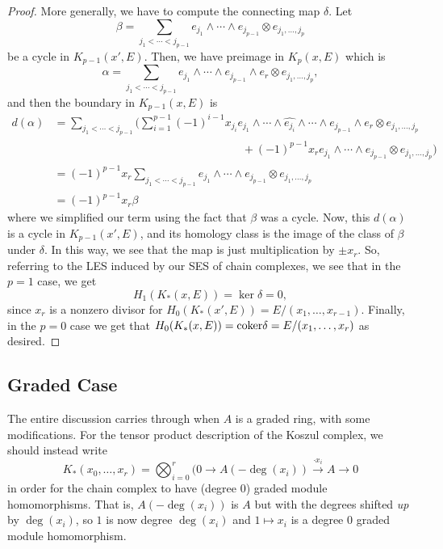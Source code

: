 \documentclass[12pt]{article}
\begin{document}
\begin{proof}
    More generally, we have to compute the connecting map $\delta$. Let
    \[\beta = \sum_{j_1<\cdots<j_{p-1}} e_{j_1}\wedge \cdots \wedge e_{j_{p-1}} \otimes e_{j_1,\dots,j_p}\]
    be a cycle in $K_{p-1}(x',E)$. Then, we have preimage in $K_p(x,E)$ which is
    \[\alpha = \sum_{j_1<\cdots<j_{p-1}} e_{j_1}\wedge \cdots \wedge e_{j_{p-1}} \wedge e_r \otimes e_{j_1,\dots,j_p},\]
    and then the boundary in $K_{p-1}(x,E)$ is
    \begin{align*}
        d(\alpha) &= \sum_{j_1<\cdots<j_{p-1}} \Big( \sum_{i=1}^{p-1} (-1)^{i-1} x_{j_i} e_{j_1}\wedge \cdots \wedge \widehat{e_{j_i}} \wedge \cdots \wedge e_{j_{p-1}} \wedge e_r \otimes e_{j_1,\dots,j_p}\\
        &\hspace{7cm}+ (-1)^{p-1} x_r e_{j_1}\wedge \cdots \wedge e_{j_{p-1}} \otimes e_{j_1,\dots,j_p} \Big)\\
        &= (-1)^{p-1} x_r \sum_{j_1<\cdots<j_{p-1}} e_{j_1}\wedge \cdots \wedge e_{j_{p-1}} \otimes e_{j_1,\dots,j_p}\\
        &= (-1)^{p-1} x_r \beta
    \end{align*}
    where we simplified our term using the fact that $\beta$ was a cycle. Now, this $d(\alpha)$ is a cycle in $K_{p-1}(x',E)$, and its homology class is the image of the class of $
    \beta$ under $\delta$. In this way, we see that the map is just multiplication by $\pm x_r$. So, referring to the LES induced by our SES of chain complexes, we see that in the $p=1$ case, we get
    \[H_1(K_*(x,E)) = \ker \delta = 0,\]
    since $x_r$ is a nonzero divisor for $H_0(K_*(x',E)) = E/(x_1,\dots,x_{r-1})$. Finally, in the $p=0$ case we get that $H_0(K_*(x,E)) = \mathrm{coker} \delta = E/(x_1,\dots,x_r)$ as desired. 
\end{proof}

\subsection{Graded Case}

The entire discussion carries through when $A$ is a graded ring, with some modifications. For the tensor product description of the Koszul complex, we should instead write
\[K_*(x_0,\dots,x_r) = \bigotimes_{i=0}^r (0\to A(-\deg(x_i)) \xrightarrow{\cdot x_i} A \to 0\]
in order for the chain complex to have (degree 0) graded module homomorphisms. That is, $A(-\deg(x_i))$ is $A$ but with the degrees shifted \textit{up} by $\deg(x_i)$, so $1$ is now degree $\deg(x_i)$ and $1\mapsto x_i$ is a degree 0 graded module homomorphism.
\end{document}
